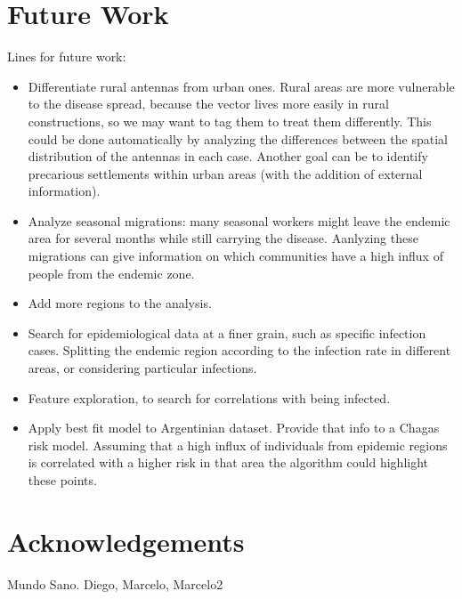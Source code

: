 \section{Future Work}
Lines for future work:
\begin{itemize}
    \item Differentiate rural antennas from urban ones. Rural areas are more vulnerable to the disease spread, because the vector lives more easily in rural constructions, so we may want to tag them to treat them differently. This could be done automatically by analyzing the differences between the spatial distribution of the antennas in each case. Another goal can be to identify precarious settlements within urban areas (with the addition of external information).
    \item Analyze seasonal migrations: many seasonal workers might leave the endemic area for several months while still carrying the disease. Aanlyzing these migrations can give information on which communities have a high influx of people from the endemic zone.
    \item Add more regions to the analysis.
    \item Search for epidemiological data at a finer grain, such as specific infection cases. Splitting the endemic region according to the infection rate in different areas, or considering particular infections.
    \item Feature exploration, to search for correlations with being infected.
    \item Apply best fit model to Argentinian dataset. Provide that info to a Chagas risk model. Assuming that a high influx of individuals from epidemic regions is correlated with a higher risk in that area the algorithm could highlight these points. %
\end{itemize}

\section{Acknowledgements}
Mundo Sano. Diego, Marcelo, Marcelo2